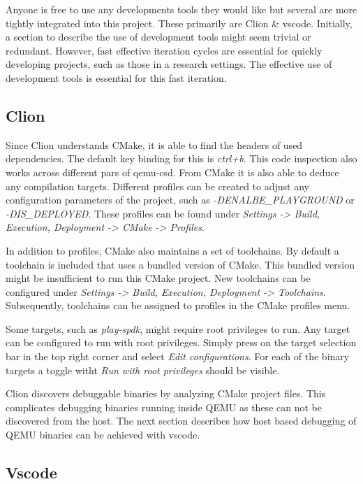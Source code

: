 \documentclass[conference]{IEEEtran}
\begin{document}
Anyone is free to use any developments tools they would like but several are
more tightly integrated into this project. These primarily are Clion \& vscode.
Initially, a section to describe the use of development tools might seem trivial
or redundant. However, fast effective iteration cycles are essential for quickly
developing projects, such as those in a research settings. The effective use of
development tools is essential for this fast iteration.

\subsection{Clion}

Since Clion understands CMake, it is able to find the headers of used
dependencies. The default key binding for this is \textit{ctrl+b}. This code
inspection also works across different pars of qemu-csd. From CMake it is also
able to deduce any compilation targets. Different profiles can be created to
adjust any configuration parameters of the project, such as
\textit{-DENALBE\_PLAYGROUND} or \textit{-DIS\_DEPLOYED}. These profiles can be
found  under \textit{Settings -> Build, Execution, Deployment -> CMake -> Profiles}.

In addition to profiles, CMake also maintains a set of toolchains. By default
a toolchain is included that uses a bundled version of CMake. This bundled
version might be insufficient to run this CMake project. New toolchains can be
configured under \textit{Settings -> Build, Execution, Deployment -> Toolchains}.
Subsequently, toolchains can be assigned to profiles in the CMake profiles menu.

Some targets, such as \textit{play-spdk}, might require root privileges to run.
Any target can be configured to run with root privileges. Simply press on the
target selection bar in the top right corner and select
\textit{Edit configurations}. For each of the binary targets a toggle witht
\textit{Run with root privileges} should be visible.

Clion discovers debuggable binaries by analyzing CMake project files. This
complicates debugging binaries running inside QEMU as these can not be
discovered from the host. The next section describes how host based debugging
of QEMU binaries can be achieved with vscode.

\subsection{Vscode}
\end{document}
